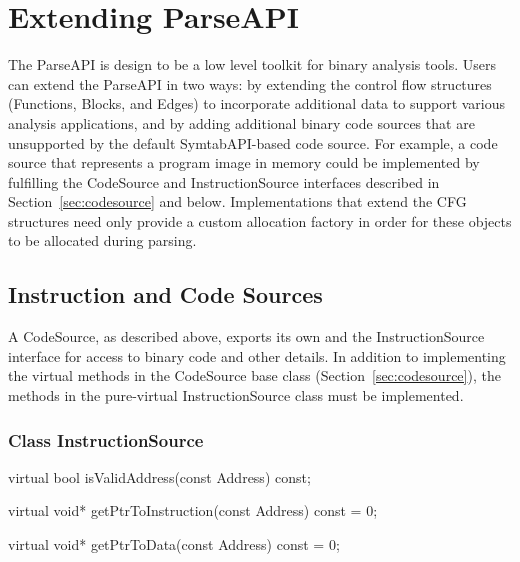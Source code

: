 \section{Extending ParseAPI}
\label{sec:extend}

The ParseAPI is design to be a low level toolkit for binary analysis tools.
Users can extend the ParseAPI in two ways: by extending the control flow
structures (Functions, Blocks, and Edges) to incorporate additional data to
support various analysis applications, and by adding additional binary code
sources that are unsupported by the default SymtabAPI-based code source. For
example, a code source that represents a program image in memory could be
implemented by fulfilling the CodeSource and InstructionSource interfaces
described in Section~\ref{sec:codesource} and below. Implementations that
extend the CFG structures need only provide a custom allocation factory in
order for these objects to be allocated during parsing.

\subsection{Instruction and Code Sources}

A CodeSource, as described above, exports its own and the InstructionSource interface for access to binary code and other details. In addition to implementing the virtual methods in the CodeSource base class (Section~\ref{sec:codesource}), the methods in the pure-virtual InstructionSource class must be implemented.

\subsubsection{Class InstructionSource}

\begin{apient}
virtual bool isValidAddress(const Address) const;
\end{apient}

\begin{apient}
virtual void* getPtrToInstruction(const Address) const = 0;
\end{apient}

\begin{apient}
virtual void* getPtrToData(const Address) const = 0;
\end{apient}

